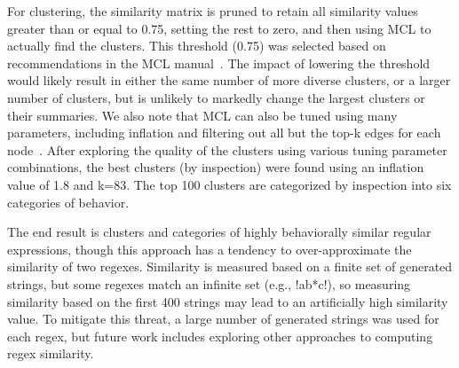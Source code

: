 For clustering, the similarity matrix is pruned to retain all similarity values greater than or equal to 0.75, setting the rest to zero, and then using MCL to actually find the clusters.
This threshold (0.75) was selected based on recommendations in the MCL manual~. The impact of lowering the threshold would likely result  in either the same number of more diverse clusters, or a larger number of clusters, but is unlikely to markedly change the largest clusters or their summaries.
We also note that MCL can also be tuned using many parameters, including inflation and filtering out all but the top-k edges for each node~.
After exploring the quality of the clusters using various tuning parameter combinations, the best clusters (by inspection) were found using an inflation value of 1.8 and k=83.   The top 100 clusters are categorized by inspection into six categories of behavior.

The end result is clusters and categories of highly behaviorally similar regular expressions, though this approach has a tendency to over-approximate the similarity of two regexes. Similarity is measured based on a finite set of generated strings, but some regexes match an infinite set (e.g., \cverb!ab*c!), so measuring similarity based on the first 400 strings may lead to an artificially high similarity value. To mitigate this threat, a large number of generated strings was used for each regex, but future work includes exploring other approaches to computing regex similarity.
